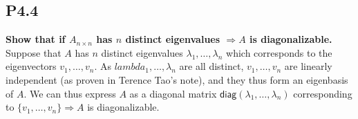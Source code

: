 \documentclass[12pt]{article}
\begin{document}
\subsection*{P4.4}
\textbf{Show that if $A_{n\times n}$ has $n$ distinct eigenvalues $\Rightarrow A$ is diagonalizable.}\\
Suppose that $A$ has $n$ distinct eigenvalues $\lambda_1,\ldots,\lambda_n$ which corresponds to the eigenvectors $v_1,\ldots,v_n$. As $lambda_1,\ldots,\lambda_n$ are all distinct, $v_1,\ldots,v_n$ are linearly independent (as proven in Terence Tao's note), and they thus form an eigenbasis of $A$. We can thus express $A$ as a diagonal matrix $\textsf{diag}(\lambda_1,\ldots,\lambda_n)$ corresponding to $\{v_1,\ldots,v_n\} \Rightarrow A$ is diagonalizable.


\end{document}

